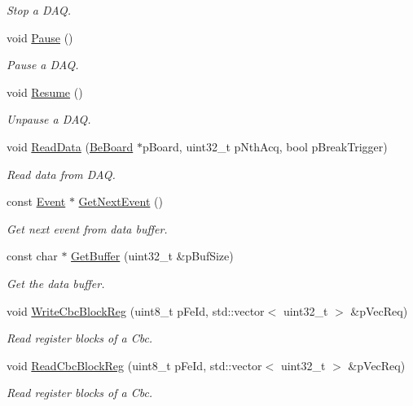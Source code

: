 \begin{DoxyCompactItemize}
\begin{DoxyCompactList}\small\item\em Stop a D\-A\-Q. \end{DoxyCompactList}\item 
void \hyperlink{class_ph2___hw_interface_1_1_glib_f_w_interface_a05d7f790e0316b51714293e8089086f3}{Pause} ()
\begin{DoxyCompactList}\small\item\em Pause a D\-A\-Q. \end{DoxyCompactList}\item 
void \hyperlink{class_ph2___hw_interface_1_1_glib_f_w_interface_aedd3abfb576016701da27fabc975ac13}{Resume} ()
\begin{DoxyCompactList}\small\item\em Unpause a D\-A\-Q. \end{DoxyCompactList}\item 
void \hyperlink{class_ph2___hw_interface_1_1_glib_f_w_interface_a26c35fec3518f40d09ebc7f0114be19b}{Read\-Data} (\hyperlink{class_ph2___hw_description_1_1_be_board}{Be\-Board} $\ast$p\-Board, uint32\-\_\-t p\-Nth\-Acq, bool p\-Break\-Trigger)
\begin{DoxyCompactList}\small\item\em Read data from D\-A\-Q. \end{DoxyCompactList}\item 
const \hyperlink{class_ph2___hw_interface_1_1_event}{Event} $\ast$ \hyperlink{class_ph2___hw_interface_1_1_glib_f_w_interface_afebeee20cd186f919189e5f349c6a49f}{Get\-Next\-Event} ()
\begin{DoxyCompactList}\small\item\em Get next event from data buffer. \end{DoxyCompactList}\item 
const char $\ast$ \hyperlink{class_ph2___hw_interface_1_1_glib_f_w_interface_a123de5dea8083175ddf299b62861e782}{Get\-Buffer} (uint32\-\_\-t \&p\-Buf\-Size)
\begin{DoxyCompactList}\small\item\em Get the data buffer. \end{DoxyCompactList}\item 
void \hyperlink{class_ph2___hw_interface_1_1_glib_f_w_interface_a2bc165eebeab754425dcbffb21aa2717}{Write\-Cbc\-Block\-Reg} (uint8\-\_\-t p\-Fe\-Id, std\-::vector$<$ uint32\-\_\-t $>$ \&p\-Vec\-Req)
\begin{DoxyCompactList}\small\item\em Read register blocks of a Cbc. \end{DoxyCompactList}\item 
void \hyperlink{class_ph2___hw_interface_1_1_glib_f_w_interface_a9dbc3cf2a991126aed53d834d4d152ce}{Read\-Cbc\-Block\-Reg} (uint8\-\_\-t p\-Fe\-Id, std\-::vector$<$ uint32\-\_\-t $>$ \&p\-Vec\-Req)
\begin{DoxyCompactList}\small\item\em Read register blocks of a Cbc. \end{DoxyCompactList}\end{DoxyCompactItemize}
